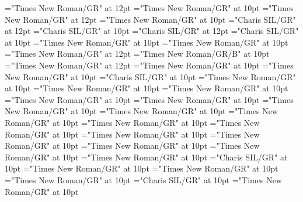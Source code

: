 \documentclass[a4paper]{article}
\begin{document}
\pagestyle{plain}
\sloppy
\setlength{\parfillskip}{0pt plus 1fil}
\font\diven="Times New Roman/GR" at 12pt
\font\spanen="Times New Roman/GR" at 10pt
\font\divtpi="Times New Roman/GR" at 12pt
\font\spantpi="Times New Roman/GR" at 10pt
\font\divbzh="Charis SIL/GR" at 12pt
\font\spanbzh="Charis SIL/GR" at 10pt
\font\divbzhfonipa="Charis SIL/GR" at 12pt
\font\spanbzhfonipa="Charis SIL/GR" at 10pt
\font\spanfr="Times New Roman/GR" at 10pt
\font\spanes="Times New Roman/GR" at 10pt
\font{}="Times New Roman/GR" at 12pt
\font{}="Times New Roman/GR/B" at 10pt
\font{}="Times New Roman/GR" at 12pt
\font\entryletData="Times New Roman/GR" at 10pt
\font\mainheadwordentryletData="Times New Roman/GR" at 10pt
\font\spanbzhmainheadwordentryletData="Charis SIL/GR" at 10pt
\font\sensesentryletData="Times New Roman/GR" at 10pt
\font\sensecontentsensesentryletData="Times New Roman/GR" at 10pt
\font\sensesensecontentsensesentryletData="Times New Roman/GR" at 10pt
\font\morphosyntaxanalysissensesensecontentsensesentryletData="Times New Roman/GR" at 10pt
\font\partofspeechmorphosyntaxanalysissensesensecontentsensesentryletData="Times New Roman/GR" at 10pt
\font\spanenpartofspeechmorphosyntaxanalysissensesensecontentsensesentryletData="Times New Roman/GR" at 10pt
\font\slotsmorphosyntaxanalysissensesensecontentsensesentryletData="Times New Roman/GR" at 10pt
\font\slotslotsmorphosyntaxanalysissensesensecontentsensesentryletData="Times New Roman/GR" at 10pt
\font\nameslotslotsmorphosyntaxanalysissensesensecontentsensesentryletData="Times New Roman/GR" at 10pt
\font\spanennameslotslotsmorphosyntaxanalysissensesensecontentsensesentryletData="Times New Roman/GR" at 10pt
\font{}="Times New Roman/GR" at 10pt
\font\spanendefinitionorglosssensesensecontentsensesentryletData="Times New Roman/GR" at 10pt
\font\pronunciationsentryletData="Times New Roman/GR" at 10pt
\font\pronunciationpronunciationsentryletData="Times New Roman/GR" at 10pt
\font\formpronunciationpronunciationsentryletData="Times New Roman/GR" at 10pt
\font\spanbzhfonipaformpronunciationpronunciationsentryletData="Charis SIL/GR" at 10pt
\font\examplessensesensecontentsensesentryletData="Times New Roman/GR" at 10pt
\font\exampleexamplessensesensecontentsensesentryletData="Times New Roman/GR" at 10pt
\font\exampleexampleexamplessensesensecontentsensesentryletData="Times New Roman/GR" at 10pt
\font\spanbzhexampleexampleexamplessensesensecontentsensesentryletData="Charis SIL/GR" at 10pt
\font\translationsexampleexamplessensesensecontentsensesentryletData="Times New Roman/GR" at 10pt
\end{document}
